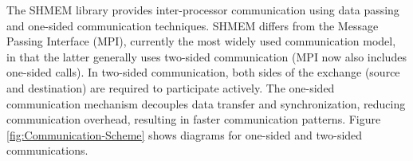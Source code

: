 The SHMEM library provides inter-processor communication using data
passing and one-sided communication techniques. SHMEM differs from
the Message Passing Interface (MPI), currently the most widely used
communication model, in that the latter generally uses two-sided communication
(MPI now also includes one-sided calls). In two-sided communication,
both sides of the exchange (source and destination) are required to
participate actively. The one-sided communication mechanism decouples
data transfer and synchronization, reducing communication overhead,
resulting in faster communication patterns. Figure \ref{fig:Communication-Scheme}
shows diagrams for one-sided and two-sided communications.\medskip{}


%
%

